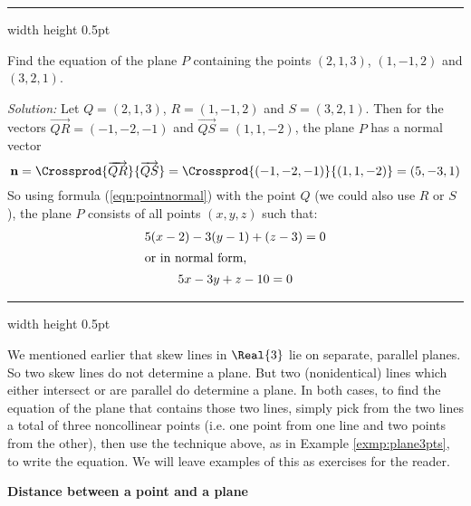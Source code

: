 \hrule width \textwidth height 0.5pt
\begin{exmp}\label{exmp:plane3pts}
 Find the equation of the plane $P$ containing the points $(2,1,3)$, $(1,-1,2)$ and $(3,2,1)$.\vspace{1mm}
 \par\noindent\emph{Solution:} Let $Q = (2,1,3)$, $R = (1,-1,2)$ and $S = (3,2,1)$. Then for the vectors
 $\overrightarrow{QR} = (-1,-2,-1)$ and $\overrightarrow{QS} = (1,1,-2)$, the plane $P$ has a normal vector
 \begin{displaymath}
  \textbf{n} = \Crossprod{\overrightarrow{QR}}{\overrightarrow{QS}} = \Crossprod{(-1,-2,-1)}{(1,1,-2)} = (5,-3,1)
 \end{displaymath}
 So using formula (\ref{eqn:pointnormal}) with the point $Q$ (we could also use $R$ or $S$), the plane $P$ consists of
 all points $(x,y,z)$ such that:
 \begin{gather*}
  5(x - 2) - 3(y - 1) + (z - 3) = 0\\
  \intertext{or in normal form,}
  5x - 3y + z - 10 = 0
 \end{gather*}
\end{exmp}
\hrule width \textwidth height 0.5pt
\vspace{2mm}

We mentioned earlier that skew lines in $\Real{3}$ lie on separate, parallel planes. So two skew lines do not determine
a plane. But two (nonidentical) lines which either intersect or are parallel do determine a plane. In both cases, to
find the equation of the plane that contains those two lines, simply pick from the two lines a total of three
noncollinear points (i.e. one point from one line and two points from the other), then use the technique above, as in
Example \ref{exmp:plane3pts}, to write the equation. We will leave examples of this as exercises for the reader.
\newpage
\par\noindent\textbf{\large{Distance between a point and a plane}}\normalsize\vspace{1.5mm}

